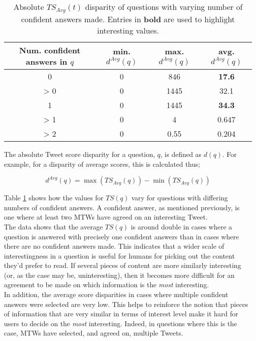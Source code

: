 \begin{enumerate}
\begin{table}[h]\footnotesize
\begin{center}
\begin{tabular}{ c | c | c | c }
	 Num. confident answers in $q$& min. $d^{Avg}(q)$ & max. $d^{Avg}(q)$ & avg. $d^{Avg}(q)$ \\
	 \hline
	0 & 0 & 846 & \textbf{17.6} \\
	> 0 & 0 & 1445 & 32.1 \\
	1 & 0 & 1445 & \textbf{34.3} \\
	> 1 & 0 & 4 & 0.647 \\
	> 2 & 0 & 0.55 & 0.204
\end{tabular}
\end{center}
\caption{Absolute $TS_{Avg}(t)$ disparity of questions with varying number of confident answers made. Entries in \textbf{bold} are used to highlight interesting values.}
\label{table:score_disparities}
\end{table}

The absolute Tweet score disparity for a question, $q$, is defined as $d(q)$. For example, for a disparity of average scores, this is calculated thus;

\[ d^{Avg}(q) = \max(TS_{Avg}(q)) - \min(TS_{Avg}(q)) \]

Table \ref{table:score_disparities} shows how the values for $TS(q)$ vary for questions with differing numbers of confident answers. A confident answer, as mentioned previously, is one where at least two MTWs have agreed on an interesting Tweet.\\
The data shows that the average $TS(q)$ is around double in cases where a question is answered with precisely one confident answers than in cases where there are no confident answers made. This indicates that a wider scale of interestingness in a question is useful for humans for picking out the content they'd prefer to read. If several pieces of content are more similarly interesting (or, as the case may be, uninteresting), then it becomes more difficult for an agreement to be made on which information is the \textit{most} interesting.\\
In addition, the average score disparities in cases where multiple confident answers were selected are very low. This helps to reinforce the notion that pieces of information that are very similar in terms of interest level make it hard for users to decide on the \textit{most} interesting. Indeed, in questions where this is the case, MTWs have selected, and agreed on, multiple Tweets.


\end{enumerate}
